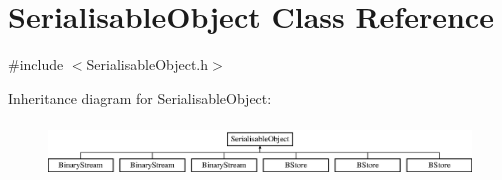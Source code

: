\hypertarget{classSerialisableObject}{\section{Serialisable\-Object Class Reference}
\label{classSerialisableObject}
}


{\ttfamily \#include $<$Serialisable\-Object.\-h$>$}

Inheritance diagram for Serialisable\-Object\-:\begin{figure}[H]
\begin{center}
\leavevmode
\includegraphics[height=1.517615cm]{classSerialisableObject}
\end{center}
\end{figure}
